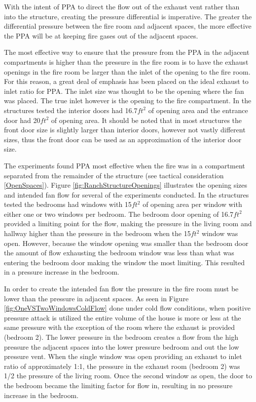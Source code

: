 \documentclass{article}
\begin{document}
With the intent of PPA to direct the flow out of the exhaust vent rather than into the structure, creating the pressure differential is imperative. The greater the differential pressure between the fire room and adjacent spaces, the more effective the PPA will be at keeping fire gases out of the adjacent spaces.

The most effective way to ensure that the pressure from the PPA in the adjacent compartments is higher than the pressure in the fire room is to have the exhaust openings in the fire room be larger than the inlet of the opening to the fire room.  For this reason, a great deal of emphasis has been placed on the ideal exhaust to inlet ratio for PPA. The inlet size was thought to be the opening where the fan was placed. The true inlet however is the opening to the fire compartment. In the structures tested the interior doors had 16.7$ft^2$ of opening area and the entrance door had 20$ft^2$ of opening area. It should be noted that in most structures the front door size is slightly larger than interior doors, however not vastly different sizes, thus the front door can be used as an approximation of the interior door size.

The experiments found PPA most effective when the fire was in a compartment separated from the remainder of the structure (see tactical consideration \ref{OpenSpaces}). Figure \ref{fig:RanchStructureOpenings} illustrates the opening sizes and intended fan flow for several of the experiments conducted. In the structures tested the bedrooms had windows with 15$ft^2$ of opening area per window with either one or two windows per bedroom. The bedroom door opening of 16.7$ft^2$ provided a limiting point for the flow, making the pressure in the living room and hallway higher than the pressure in the bedroom when the 15$ft^2$ window was open. However, because the window opening was smaller than the bedroom door the amount of flow exhausting the bedroom window was less than what was entering the bedroom door making the window the most limiting. This resulted in a pressure increase in the bedroom. 

In order to create the intended fan flow the pressure in the fire room must be lower than the pressure in adjacent spaces. As seen in Figure \ref{fig:OneVSTwoWindowsColdFlow} done under cold flow conditions, when positive pressure attack is utilized the entire volume of the house is more or less at the same pressure with the exception of the room where the exhaust is provided (bedroom 2). The lower pressure in the bedroom creates a flow from the high pressure the adjacent spaces into the lower pressure bedroom and out the low pressure vent. When the single window was open providing an exhaust to inlet ratio of approximately 1:1, the pressure in the exhaust room (bedroom 2) was 1/2 the pressure of the living room. Once the second window as open, the door to the bedroom became the limiting factor for flow in, resulting in no pressure increase in the bedroom.
\end{document}
